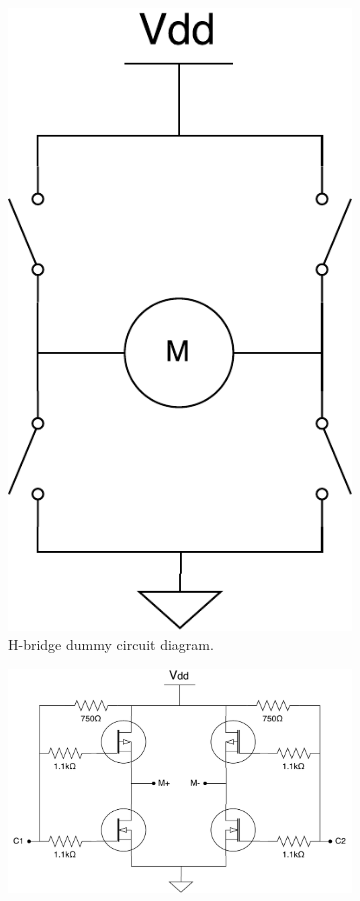 \documentclass[letterpaper, 11pt]{article}
\begin{document}
\begin{enumerate}[label=\textbf{\arabic*.}]
\begin{figure}[ht]
    \centering
    \begin{subfigure}[t]{0.48\textwidth}
        \centering
        \includegraphics[height=0.4\textheight]{images/hbridge.pdf}
        \caption{H-bridge dummy circuit diagram.}
        \label{fig:hb-dummy}
    \end{subfigure}\hfill
    \begin{subfigure}[t]{0.48\textwidth}
        \includegraphics[height=0.4\textheight]{images/hbridge-circuit.pdf}

\end{subfigure}
\end{figure}
\end{enumerate}
\end{document}

